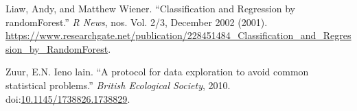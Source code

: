 \documentclass[a4paper, nobind]{templates/ociamthesis}
\newcommand*{\bibtitle}{Works Cited}
\begin{document}
\leavevmode\hypertarget{ref-Liaw2002}{}%
Liaw, Andy, and Matthew Wiener. ``Classification and Regression by randomForest.'' \emph{R News}, nos. Vol. 2/3, December 2002 (2001). \url{https://www.researchgate.net/publication/228451484_Classification_and_Regression_by_RandomForest}.

\leavevmode\hypertarget{ref-Zuur2010}{}%
Zuur, E.N. Ieno lain. ``A protocol for data exploration to avoid common statistical problems.'' \emph{British Ecological Society}, 2010. doi:\href{https://doi.org/10.1145/1738826.1738829}{10.1145/1738826.1738829}.




\setlength{\baselineskip}{0pt} %

{\renewcommand*\MakeUppercase[1]{#1}%
\printbibliography[heading=bibintoc,title={\bibtitle}]}
\end{document}

